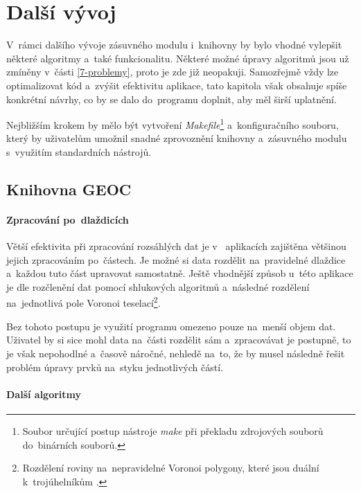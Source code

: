 \chapter{Další vývoj}
\label{8-vyvoj}

V~rámci dalšího vývoje zásuvného modulu i~knihovny 
by bylo vhodné vylepšit některé algoritmy a~také funkcionalitu.
Některé možné úpravy algoritmů jsou už zmíněny v~části 
\ref{7-problemy}, proto je zde již neopakuji. 
Samozřejmě vždy lze optimalizovat kód a~zvýšit efektivitu aplikace,
tato kapitola však obsahuje spíše konkrétní návrhy, co by se dalo 
do~programu doplnit, aby měl širší uplatnění.

Nejbližším krokem by mělo být vytvoření \textit{Makefile}\footnote{Soubor 
určující postup nástroje \textit{make} při překladu zdrojových
souborů do~binárních souborů.} a~konfiguračního souboru, který by 
uživatelům umožnil snadné zprovoznění knihovny a~zásuvného modulu
s~využitím standardních nástrojů.

\section{Knihovna GEOC}
\label{geoc-vyvoj}

\subsubsection{Zpracování po~dlaždicích}
\label{dlazdice-vyvoj}

Větší efektivita při zpracování rozsáhlých dat je v~ 
aplikacích zajištěna většinou jejich zpracováním po~částech. Je možné
si data rozdělit na~pravidelné dlaždice a~každou tuto část upravovat
samostatně. Ještě vhodnější způsob u~této aplikace je dle \cite{freitas}
rozčlenění dat pomocí shlukových algoritmů a~následné rozdělení
na~jednotlivá pole Voronoi teselací\footnote{Rozdělení roviny 
na~nepravidelné Voronoi polygony, které jsou duální k~trojúhelníkům
.}.

Bez tohoto postupu je využití programu omezeno pouze na~menší objem
dat. Uživatel by si sice mohl data na~části rozdělit sám a~zpracovávat
je postupně, to je však nepohodlné a~časově náročné, nehledě na~to,
že by musel následně řešit problém úpravy prvků na~styku jednotlivých 
částí.


\subsubsection{Další algoritmy}
\label{dalsi-vyvoj}

